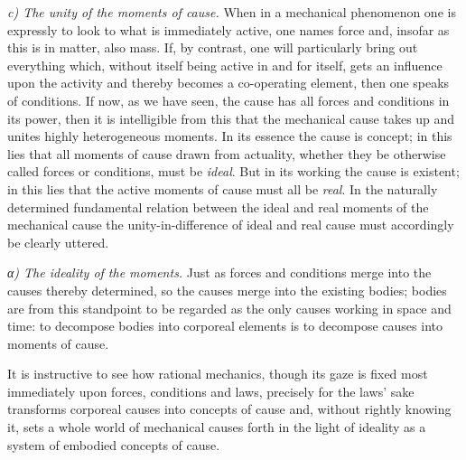 \documentclass[12pt,a4paper]{book}
\newcommand{\runin}[1]{\emph{#1}\hspace{0.4em}}
\newcommand{\subrunin}[1]{\emph{#1}\hspace{0.4em}}
\begin{document}
\runin{c) The unity of the moments of cause.} When in a mechanical phenomenon one is expressly
to look to what is immediately active, one names force and, insofar as this is in matter, also
mass. If, by contrast, one will particularly bring out everything which, without itself being
active in and for itself, gets an influence upon the activity and thereby becomes a
co-operating element, then one speaks of conditions. If now, as we have seen, the cause has
all forces and conditions in its power, then it is intelligible from this that the mechanical
cause takes up and unites highly heterogeneous moments. In its essence the cause is concept;
in this lies that all moments of cause drawn from actuality, whether they be otherwise called
forces or conditions, must be \emph{ideal}. But in its working the cause is existent; in this
lies that the
active moments of cause must all be \emph{real}. In the naturally determined fundamental
relation between the ideal and real moments of the mechanical cause the unity-in-difference of
ideal and real cause must accordingly be clearly uttered.

\subrunin{α) The ideality of the moments.} Just as forces and conditions merge into the causes
thereby determined, so the causes merge into the existing bodies; bodies are from this
standpoint to be regarded as the only causes working in space and time: to decompose bodies
into corporeal elements is to decompose causes into moments of cause.

It is instructive to see how rational mechanics, though its gaze is fixed most immediately
upon forces, conditions and laws, precisely for the laws' sake transforms corporeal causes
into concepts of cause and, without rightly knowing it, sets a whole world of mechanical
causes forth in the light of ideality as a system of embodied concepts of cause.
\end{document}
